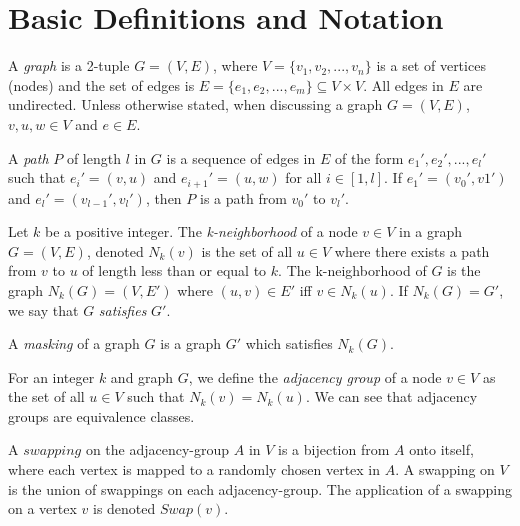 \section{Basic Definitions and Notation}

\begin{definition}
A \emph{graph} is a 2-tuple $G = (V,E)$, where $V = \{v_1,v_2,...,v_n\}$ is a set of vertices (nodes) and the set of edges is $E = \{e_1,e_2,...,e_m\} \subseteq V \times V$. All edges in $E$ are undirected. Unless otherwise stated, when discussing a graph $G=(V,E)$, $v,u,w \in V$ and $e \in E$. 
\end{definition}

\begin{definition}
 A \emph{path} $P$ of length $l$ in $G$ is a sequence of edges in $E$ of the form $e_1', e_2', ...,e_l'$ such that $e_i' = (v,u)$ and $e_{i+1}' = (u,w)$ for all $i \in [1,l]$. If $e_1' = (v_0', v1')$ and $e_l' = (v_{l-1}', v_l')$, then $P$ is a path from $v_0'$ to $v_l'$. 
\end{definition}

\begin{definition}
Let $k$ be a positive integer. The \emph{k-neighborhood} of a node $v \in V$ in a graph $G = (V,E)$, denoted $N_k(v)$ is the set of all $u \in V$ where there exists a path from $v$ to $u$ of length less than or equal to $k$. The k-neighborhood of $G$ is the graph $N_k(G) = (V, E')$ where $(u,v) \in E'$ iff $v \in N_k(u)$. If $N_k(G) = G'$, we say that $G$ \emph{satisfies} $G'$. 
\end{definition}

\begin{definition}
A \emph{masking} of a graph $G$ is a graph $G'$ which satisfies $N_k(G)$.\\
\end{definition}


\begin{definition}
For an integer $k$ and graph $G$, we define the \emph{adjacency group} of a node $v \in V$ as the set of all $u \in V$ such that $N_k(v) = N_k(u)$. We can see that adjacency groups are equivalence classes.
\end{definition}

\begin{definition}
A $swapping$ on the adjacency-group $A$ in $V$ is a bijection from $A$ onto itself, where each vertex is mapped to a randomly chosen vertex in $A$. A swapping on $V$ is the union of swappings on each adjacency-group. The application of a swapping on a vertex $v$ is denoted $Swap(v)$.
\end{definition}